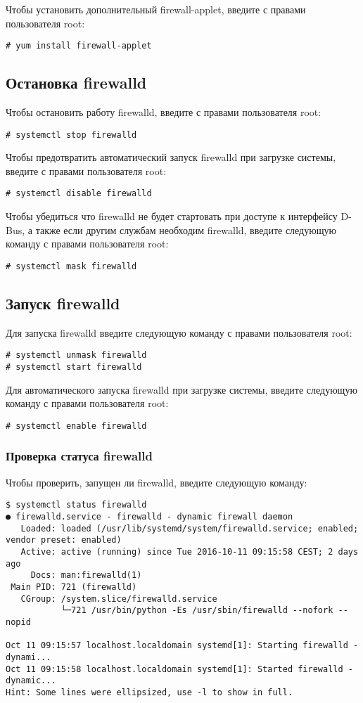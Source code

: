 \documentclass[a4paper,10pt,twoside]{article}
\begin{document}
Чтобы установить дополнительный firewall-applet, введите с правами пользователя root: 
\begin{verbatim}
# yum install firewall-applet
\end{verbatim} 


\subsection{⁠Остановка firewalld}
Чтобы остановить работу firewalld, введите с правами пользователя root:
\begin{verbatim}
# systemctl stop firewalld
\end{verbatim} 

Чтобы предотвратить автоматический запуск firewalld при загрузке системы, введите с правами пользователя root: 
\begin{verbatim}
# systemctl disable firewalld
\end{verbatim} 

Чтобы убедиться что firewalld не будет стартовать при доступе к интерфейсу D-Bus, а также если другим службам необходим firewalld, введите следующую команду с правами пользователя root: 
\begin{verbatim}
# systemctl mask firewalld
\end{verbatim} 


\subsection{Запуск firewalld}
Для запуска firewalld введите следующую команду с правами пользователя root:
\begin{verbatim}
# systemctl unmask firewalld
# systemctl start firewalld
\end{verbatim} 

Для автоматического запуска firewalld при загрузке системы, введите следующую команду с правами пользователя root:
\begin{verbatim}
# systemctl enable firewalld
\end{verbatim} 


\subsubsection{Проверка статуса firewalld}
Чтобы проверить, запущен ли firewalld, введите следующую команду:
\begin{verbatim}
$ systemctl status firewalld
● firewalld.service - firewalld - dynamic firewall daemon
   Loaded: loaded (/usr/lib/systemd/system/firewalld.service; enabled; vendor preset: enabled)
   Active: active (running) since Tue 2016-10-11 09:15:58 CEST; 2 days ago
     Docs: man:firewalld(1)
 Main PID: 721 (firewalld)
   CGroup: /system.slice/firewalld.service
           └─721 /usr/bin/python -Es /usr/sbin/firewalld --nofork --nopid

Oct 11 09:15:57 localhost.localdomain systemd[1]: Starting firewalld - dynami...
Oct 11 09:15:58 localhost.localdomain systemd[1]: Started firewalld - dynamic...
Hint: Some lines were ellipsized, use -l to show in full.
\end{verbatim} 
\end{document}
